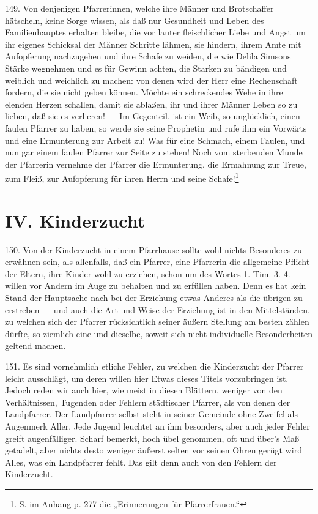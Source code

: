 149. Von denjenigen Pfarrerinnen, welche ihre Männer und Brotschaffer hätscheln, keine Sorge wissen, als daß nur Gesundheit und Leben des Familienhauptes erhalten bleibe, die vor lauter fleischlicher Liebe und Angst um ihr eigenes Schicksal der Männer Schritte lähmen, sie hindern, ihrem Amte mit Aufopferung nachzugehen und ihre Schafe zu weiden, die wie Delila Simsons Stärke wegnehmen und es für Gewinn achten, die Starken zu bändigen und weiblich und weichlich zu machen: von denen wird der Herr eine Rechenschaft fordern, die sie nicht geben können. Möchte ein schreckendes Wehe in ihre elenden Herzen
schallen, damit sie ablaßen, ihr und ihrer Männer Leben so zu lieben, daß sie es verlieren! — Im Gegenteil, ist ein Weib, so unglücklich, einen faulen Pfarrer zu haben, so werde sie seine Prophetin und rufe ihm ein Vorwärts und eine Ermunterung zur Arbeit zu! Was für eine Schmach, einem Faulen, und nun gar einem faulen Pfarrer zur Seite zu stehen! Noch vom sterbenden Munde der Pfarrerin vernehme der Pfarrer die Ermunterung, die Ermahnung zur Treue, zum Fleiß, zur Aufopferung für ihren Herrn und seine Schafe!\footnote{S. im Anhang p. 277 die „Erinnerungen für Pfarrerfrauen.“}

\section{IV. Kinderzucht}

150. Von der Kinderzucht in einem Pfarrhause sollte wohl nichts Besonderes zu erwähnen sein, als allenfalls, daß ein Pfarrer, eine Pfarrerin die allgemeine Pflicht der Eltern, ihre Kinder wohl zu erziehen, schon um des Wortes 1. Tim. 3. 4. willen vor Andern im Auge zu behalten und zu erfüllen haben. Denn es hat kein Stand der Hauptsache nach bei der Erziehung etwas Anderes als die übrigen zu erstreben — und auch die Art und Weise der Erziehung ist in den Mittelständen, zu welchen sich der Pfarrer rücksichtlich seiner äußern Stellung am besten zählen dürfte, so ziemlich eine und dieselbe, soweit sich nicht individuelle Besonderheiten geltend machen.

151. Es sind vornehmlich etliche Fehler, zu welchen die Kinderzucht der Pfarrer leicht ausschlägt, um deren willen hier Etwas dieses Titels vorzubringen ist. Jedoch reden wir auch hier, wie meist in diesen Blättern, weniger von den Verhältnissen, Tugenden oder Fehlern städtischer Pfarrer, als von denen der Landpfarrer. Der Landpfarrer selbst steht in seiner Gemeinde ohne Zweifel als Augenmerk Aller. Jede Jugend leuchtet an ihm besonders, aber auch jeder Fehler greift augenfälliger. Scharf bemerkt, hoch übel genommen, oft und über’s Maß getadelt, aber nichts desto weniger äußerst selten vor seinen Ohren gerügt wird Alles, was ein Landpfarrer fehlt. Das gilt denn auch von den Fehlern der Kinderzucht.

